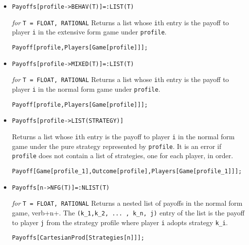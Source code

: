 \begin{itemize}
\item{}
\protect \large \begin{verbatim}
Payoffs[profile->BEHAV(T)]=:LIST(T)
\end{verbatim}\normalsize

{\it for} {\tt T = FLOAT, RATIONAL}
\bd 
Returns a list whose \verb+i+th entry is the payoff to player \verb+i+
in the extensive form game under \verb+profile+.
\begin{verbatim}
Payoff[profile,Players[Game[profile]]];
\end{verbatim} 
\ed

\item{}
\protect \large \begin{verbatim}
Payoffs[profile->MIXED(T)]=:LIST(T)
\end{verbatim}\normalsize

{\it for} {\tt T = FLOAT, RATIONAL}
\bd 
Returns a list whose \verb+i+th entry is the payoff to player \verb+i+
in the normal form game under \verb+profile+.
\begin{verbatim}
Payoff[profile,Players[Game[profile]]];
\end{verbatim} 
\ed

\item{}
\protect \large \begin{verbatim}
Payoffs[profile->LIST(STRATEGY)]
\end{verbatim}\normalsize

\bd 
Returns a list whose \verb+i+th entry is the payoff to player \verb+i+
in the normal form game under the pure strategy represented by \verb+profile+.
It is an error if \verb+profile+ does not contain a list of
strategies, one for each player, in order.  
\begin{verbatim}
Payoff[Game[profile_1],Outcome[profile],Players[Game[profile_1]]];
\end{verbatim} 
\ed


\item{}
\protect \large \begin{verbatim}
Payoffs[n->NFG(T)]=:NLIST(T)
\end{verbatim}\normalsize

{\it for} {\tt T = FLOAT, RATIONAL} 
\bd 
Returns a nested list of payoffs in the normal form game, verb+n+.
The \verb+(k_1,k_2, ... , k_n, j)+ entry of the list is the payoff to
player \verb+j+ from the strategy profile where player \verb+i+ adopts
strategy \verb+k_i+.
\begin{verbatim}
Payoffs[CartesianProd[Strategies[n]]];
\end{verbatim} 
\ed
  


\end{itemize}

